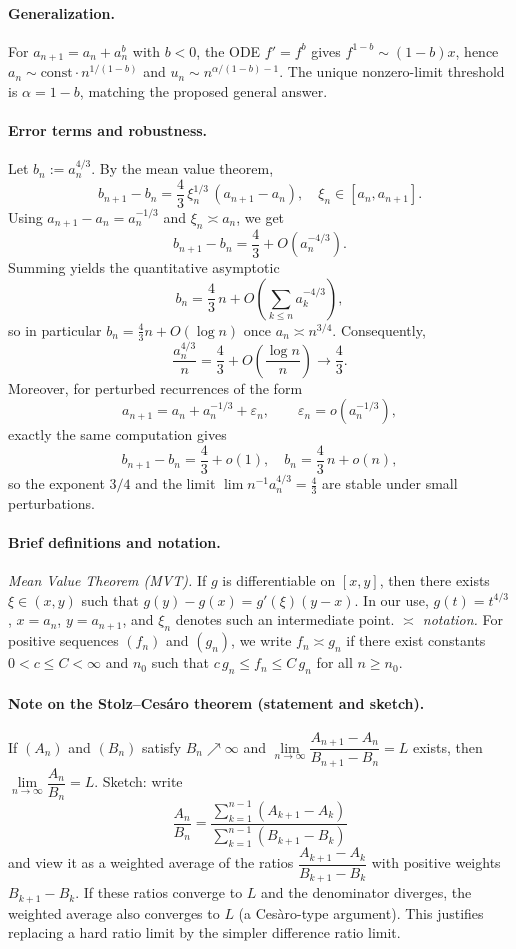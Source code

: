\documentclass{article}
\begin{document}
\paragraph{Generalization.}
For $a_{n+1}=a_n+a_n^b$ with $b<0$, the ODE $f'=f^b$ gives $f^{1-b}\sim (1-b)x$, hence $a_n\sim \text{const}\cdot n^{1/(1-b)}$ and $u_n\sim n^{\alpha/(1-b)-1}$. The unique nonzero-limit threshold is $\alpha=1-b$, matching the proposed general answer.

\paragraph{Error terms and robustness.}
Let $b_n:=a_n^{4/3}$. By the mean value theorem,
$$b_{n+1}-b_n=\frac{4}{3}\,\xi_n^{1/3}\,(a_{n+1}-a_n),\quad \xi_n\in[a_n,a_{n+1}].$$
Using $a_{n+1}-a_n=a_n^{-1/3}$ and $\xi_n\asymp a_n$, we get
$$b_{n+1}-b_n=\frac{4}{3}+O\!\left(a_n^{-4/3}\right).$$
Summing yields the quantitative asymptotic
$$b_n=\frac{4}{3}\,n+O\!\left(\sum_{k\le n} a_k^{-4/3}\right),$$
so in particular $b_n=\tfrac{4}{3}n+O(\log n)$ once $a_n\asymp n^{3/4}$. Consequently,
$$\frac{a_n^{4/3}}{n}=\frac{4}{3}+O\!\left(\frac{\log n}{n}\right)\to\frac{4}{3}.$$
Moreover, for perturbed recurrences of the form
$$a_{n+1}=a_n+a_n^{-1/3}+\varepsilon_n,\qquad \varepsilon_n=o\!\left(a_n^{-1/3}\right),$$
exactly the same computation gives
$$b_{n+1}-b_n=\frac{4}{3}+o(1),\quad b_n=\frac{4}{3}\,n+o(n),$$
so the exponent $3/4$ and the limit $\lim n^{-1}a_n^{4/3}=\tfrac{4}{3}$ are stable under small perturbations.

\paragraph{Brief definitions and notation.}
\emph{Mean Value Theorem (MVT).} If $g$ is differentiable on $[x,y]$, then there exists $\xi\in(x,y)$ such that $g(y)-g(x)=g'(\xi)(y-x)$. In our use, $g(t)=t^{4/3}$, $x=a_n$, $y=a_{n+1}$, and $\xi_n$ denotes such an intermediate point.\newline
\emph{$\asymp$ notation.} For positive sequences $(f_n)$ and $(g_n)$, we write $f_n\asymp g_n$ if there exist constants $0<c\le C<\infty$ and $n_0$ such that $c\,g_n\le f_n\le C\,g_n$ for all $n\ge n_0$.

\paragraph{Note on the Stolz--Ces\'aro theorem (statement and sketch).}
If $(A_n)$ and $(B_n)$ satisfy $B_n\nearrow\infty$ and $\lim\limits_{n\to\infty}\dfrac{A_{n+1}-A_n}{B_{n+1}-B_n}=L$ exists, then $\lim\limits_{n\to\infty}\dfrac{A_n}{B_n}=L$. Sketch: write
$$\frac{A_n}{B_n}=\frac{\sum_{k=1}^{n-1}(A_{k+1}-A_k)}{\sum_{k=1}^{n-1}(B_{k+1}-B_k)}$$
and view it as a weighted average of the ratios $\dfrac{A_{k+1}-A_k}{B_{k+1}-B_k}$ with positive weights $B_{k+1}-B_k$. If these ratios converge to $L$ and the denominator diverges, the weighted average also converges to $L$ (a Ces\`aro-type argument). This justifies replacing a hard ratio limit by the simpler difference ratio limit.
\end{document}
